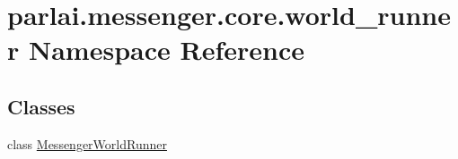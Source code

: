 \hypertarget{namespaceparlai_1_1messenger_1_1core_1_1world__runner}{}\section{parlai.\+messenger.\+core.\+world\+\_\+runner Namespace Reference}
\label{namespaceparlai_1_1messenger_1_1core_1_1world__runner}
\subsection*{Classes}
\begin{DoxyCompactItemize}
\item 
class \hyperlink{classparlai_1_1messenger_1_1core_1_1world__runner_1_1MessengerWorldRunner}{Messenger\+World\+Runner}
\end{DoxyCompactItemize}
